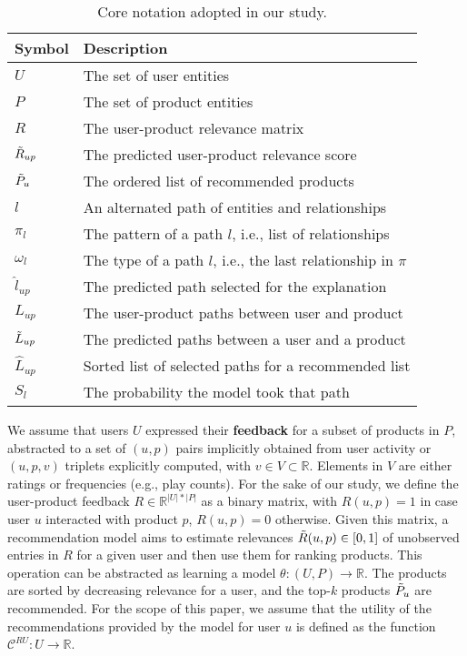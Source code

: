 \documentclass[sigconf]{acmart}
\begin{document}
\begin{table}[!t]
  \caption{Core notation adopted in our study.}
  \vspace{-4mm}
  \label{tab:table-of-notation}
  \begin{tabular}{ll}
    \toprule
    \textbf{Symbol} & \textbf{Description} \\
    \hline
    \midrule
    $U$ & The set of user entities \\
    $P$ & The set of product entities \\
    $R$ & The user-product relevance matrix\\
    $\Tilde{R}_{up}$ & The predicted user-product relevance score\\
    $\Tilde{P}_u$ & The ordered list of recommended products\\
    \hline 
    $l$ & An alternated path of entities and relationships\\
    $\pi_l$ & The pattern of a path $l$, i.e., list of relationships\\
    $\omega_l$ & The type of a path $l$, i.e., the last relationship in $\pi$\\
    $\hat{l}_{up}$ & The predicted path selected for the explanation\\
    \hline 
    $L_{up}$ & The user-product paths between user and product\\
    $\Tilde{L}_{up}$ & The predicted paths between a user and a product\\
    $\hat{L}_{up}$ & Sorted list of selected paths for a recommended list\\
    $S_l$ & The probability the model took that path \\
    \bottomrule
  \end{tabular}
\end{table}

We assume that users $U$ expressed their \textbf{feedback} for a subset of products in $P$, abstracted to a set of $(u, p)$ pairs implicitly obtained from user activity or $(u, p, v)$ triplets explicitly computed, with $v \in V \subset \mathbb R$. 
Elements in $V$ are either ratings or frequencies (e.g., play counts). 
For the sake of our study, we define the user-product feedback $R \in \mathbb R^{|U| * |P|}$ as a binary matrix, with $R(u, p) = 1$ in case user $u$ interacted with product $p$, $R(u, p) = 0$ otherwise. 
Given this matrix, a recommendation model aims to estimate relevances $\Tilde{R}(u, p) \in [0, 1]$ of unobserved entries in $R$ for a given user and then use them for ranking products. 
This operation can be abstracted as learning a model $\theta : (U, P) \rightarrow \mathbb R$. 
The products are sorted by decreasing relevance for a user, and the top-$k$ products $\Tilde{P}_u$ are recommended.  
For the scope of this paper, we assume that the utility of the recommendations provided by the model for user $u$ is defined as the function $\mathcal C^{RU} : U \xrightarrow[]{} \mathbb{R}$. 
\end{document}
